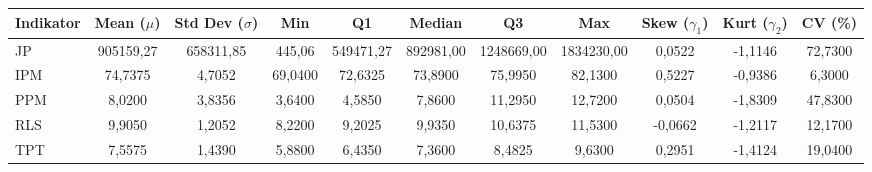 \begin{adjustbox}{max width=\textwidth}
\small
\begin{tabular}{|>{\centering\arraybackslash}p{2.5cm}|c|c|c|c|c|c|c|c|c|c|}
\hline
\textbf{Indikator} & \textbf{Mean ($\mu$)} & \textbf{Std Dev ($\sigma$)} & \textbf{Min} & \textbf{Q1} & \textbf{Median} & \textbf{Q3} & \textbf{Max} & \textbf{Skew ($\gamma_1$)} & \textbf{Kurt ($\gamma_2$)} & \textbf{CV (\%)} \\
\hline
JP & 905159,27 & 658311,85 & 445,06 & 549471,27 & 892981,00 & 1248669,00 & 1834230,00 & 0,0522 & -1,1146 & 72,7300 \\
IPM & 74,7375 & 4,7052 & 69,0400 & 72,6325 & 73,8900 & 75,9950 & 82,1300 & 0,5227 & -0,9386 & 6,3000 \\
PPM & 8,0200 & 3,8356 & 3,6400 & 4,5850 & 7,8600 & 11,2950 & 12,7200 & 0,0504 & -1,8309 & 47,8300 \\
RLS & 9,9050 & 1,2052 & 8,2200 & 9,2025 & 9,9350 & 10,6375 & 11,5300 & -0,0662 & -1,2117 & 12,1700 \\
TPT & 7,5575 & 1,4390 & 5,8800 & 6,4350 & 7,3600 & 8,4825 & 9,6300 & 0,2951 & -1,4124 & 19,0400 \\
\hline
\end{tabular}
\end{adjustbox}
